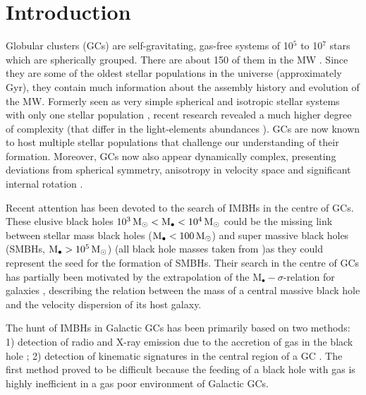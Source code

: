 

\section{Introduction}\label{sec:Introduction}
Globular clusters (\acsp{GC}) are self-gravitating, gas-free systems of 10\(^5\) to 10\(^7\) stars which are spherically grouped. There are about 150 of them in the \ac{MW} \citep{1996AJ....112.1487H}. Since they are some of the oldest stellar populations in the universe (approximately \unit[13]{Gyr}), they contain much information about the assembly history and evolution of the \ac{MW}. Formerly seen as very simple spherical and isotropic stellar systems with only one stellar population \citep{1997A&ARv...8....1M}, recent research revealed a much higher degree of complexity (that differ in the light-elements abundances \citep{2015AJ....149...91P}). \acp{GC} are now known to host multiple stellar populations that challenge our understanding of their formation. Moreover, \acp{GC} now also appear dynamically complex, presenting deviations from spherical symmetry, anisotropy in velocity space and significant internal rotation \citep{2012A&A...539A..65Z,2013ApJ...772...67B,2014A&A...567A..69K}.
\par Recent attention has been devoted to the search of \acfp{IMBH} in the centre of \acp{GC}. These elusive black holes \(\unit[10^3]{\mathrm{M}_\odot} < \mathrm{M}_\bullet < \unit[10^4]{\mathrm{M}_\odot}\) could be the missing link between stellar mass black holes (\(\mathrm{M}_\bullet < \unit[100]{\mathrm{M}_\odot}\)) and super massive black holes (\acsp{SMBH}, \(\mathrm{M}_\bullet > \unit[10^5]{\mathrm{M}_\odot}\))  (all black hole masses taken from \citet[p.639]{2006ima..book.....C} )as they could represent the seed for the formation of \acp{SMBH}. Their search in the centre of \acp{GC} has partially been motivated by the extrapolation of the \(\mathrm{M}_\bullet-\sigma\)-relation for galaxies \citep{2000ApJ...539L...9F}, describing the relation between the mass of a central massive black hole and the velocity dispersion of its host galaxy.
\par The hunt of \acp{IMBH} in Galactic \acp{GC} has been primarily based on two methods: 1) detection of radio and X-ray emission due to the accretion of gas in the black hole \citep{2002MNRAS.330..232C,2008MNRAS.389..379M,2012A&A...542A..44K,2012ApJ...750L..27S}; 2) detection of kinematic signatures in the central region of a \ac{GC} \citep{1976ApJ...209..214B,2013A&A...552A..49L}. The first method proved to be difficult because the feeding of a black hole with gas is highly inefficient in a gas poor environment of Galactic \acp{GC}. 

